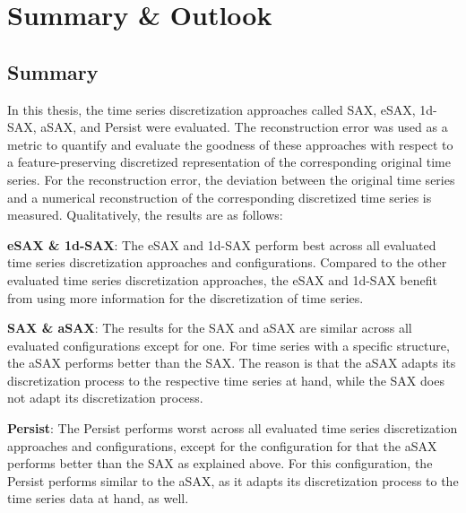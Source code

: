 \chapter{Summary \& Outlook} \label{last_chapter}
\section{Summary}
In this thesis, the time series discretization approaches called \ac{SAX}, \ac{eSAX}, \ac{1d-SAX}, \ac{aSAX}, and Persist were evaluated. \newline
The reconstruction error was used as a metric to quantify and evaluate the goodness of these approaches with respect to a feature-preserving discretized representation of the corresponding original time series. For the reconstruction error, the deviation between the original time series and a numerical reconstruction of the corresponding discretized time series is measured. Qualitatively, the results are as follows:

\textbf{\ac{eSAX} \& \ac{1d-SAX}}: \newline
The \ac{eSAX} and \ac{1d-SAX} perform best across all evaluated time series discretization approaches and configurations. Compared to the other evaluated time series discretization approaches, the \ac{eSAX} and \ac{1d-SAX} benefit from using more information for the discretization of time series.

\textbf{\ac{SAX} \& \ac{aSAX}}: The results for the \ac{SAX} and \ac{aSAX} are similar across all evaluated configurations except for one. For time series with a specific structure, the \ac{aSAX} performs better than the \ac{SAX}. The reason is that the \ac{aSAX} adapts its discretization process to the respective time series at hand, while the \ac{SAX} does not adapt its discretization process.

\textbf{Persist}:
The Persist performs worst across all evaluated time series discretization approaches and configurations, except for the configuration for that the \ac{aSAX} performs better than the \ac{SAX} as explained above. For this configuration, the Persist performs similar to the \ac{aSAX}, as it adapts its discretization process to the time series data at hand, as well.

